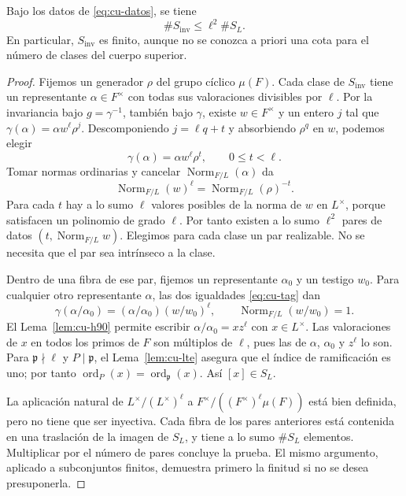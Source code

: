 \begin{teorema}
\label{thm:cu-inv}
Bajo los datos de \eqref{eq:cu-datos}, se tiene
\begin{equation}
 \#S_{\mathrm{inv}}\le\ell^2\#S_L.
 \label{eq:cu-inv}
\end{equation}
En particular, $S_{\mathrm{inv}}$ es finito, aunque no se conozca a priori una cota para el número de clases del cuerpo superior.
\end{teorema}
\begin{proof}
Fijemos un generador $\rho$ del grupo cíclico $\mu(F)$. Cada clase de $S_{\mathrm{inv}}$ tiene un representante $\alpha\in F^\times$ con todas sus valoraciones divisibles por $\ell$. Por la invariancia bajo $g=\gamma^{-1}$, también bajo $\gamma$, existe $w\in F^\times$ y un entero $j$ tal que $\gamma(\alpha)=\alpha w^\ell\rho^j$. Descomponiendo $j=\ell q+t$ y absorbiendo $\rho^q$ en $w$, podemos elegir
\begin{equation}
 \gamma(\alpha)=\alpha w^\ell\rho^t,
 \qquad 0\le t<\ell.
 \label{eq:cu-tag}
\end{equation}
Tomar normas ordinarias y cancelar $\operatorname{Norm}_{F/L}(\alpha)$ da
\begin{equation}
 \operatorname{Norm}_{F/L}(w)^\ell
 =\operatorname{Norm}_{F/L}(\rho)^{-t}.
 \label{eq:cu-tagnorm}
\end{equation}
Para cada $t$ hay a lo sumo $\ell$ valores posibles de la norma de $w$ en $L^\times$, porque satisfacen un polinomio de grado $\ell$. Por tanto existen a lo sumo $\ell^2$ pares de datos $(t,\operatorname{Norm}_{F/L}w)$. Elegimos para cada clase un par realizable. No se necesita que el par sea intrínseco a la clase.

Dentro de una fibra de ese par, fijemos un representante $\alpha_0$ y un testigo $w_0$. Para cualquier otro representante $\alpha$, las dos igualdades \eqref{eq:cu-tag} dan
\[
 \gamma(\alpha/\alpha_0)=(\alpha/\alpha_0)(w/w_0)^\ell,
 \qquad\operatorname{Norm}_{F/L}(w/w_0)=1.
\]
El Lema~\ref{lem:cu-h90} permite escribir $\alpha/\alpha_0=xz^\ell$ con $x\in L^\times$. Las valoraciones de $x$ en todos los primos de $F$ son múltiplos de $\ell$, pues las de $\alpha$, $\alpha_0$ y $z^\ell$ lo son. Para $\mathfrak p\nmid\ell$ y $P\mid\mathfrak p$, el Lema~\ref{lem:cu-lte} asegura que el índice de ramificación es uno; por tanto $\operatorname{ord}_{P}(x)=\operatorname{ord}_{\mathfrak p}(x)$. Así $[x]\in S_L$.

La aplicación natural de $L^\times/(L^\times)^\ell$ a $F^\times/((F^\times)^\ell\mu(F))$ está bien definida, pero no tiene que ser inyectiva. Cada fibra de los pares anteriores está contenida en una traslación de la imagen de $S_L$, y tiene a lo sumo $\#S_L$ elementos. Multiplicar por el número de pares concluye la prueba. El mismo argumento, aplicado a subconjuntos finitos, demuestra primero la finitud si no se desea presuponerla.
\end{proof}


